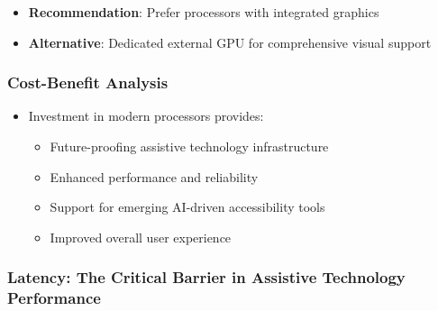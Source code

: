 \begin{itemize}
\item \textbf{Recommendation}: Prefer processors with integrated graphics \cite{IntelIntegratedGraphics}
\item \textbf{Alternative}: Dedicated external GPU for comprehensive visual support \cite{ExternalGPUAssistiveTech}
\end{itemize}


\subsubsection{Cost-Benefit Analysis}

\begin{itemize}
\item Investment in modern processors provides:
\begin{itemize}
\item Future-proofing assistive technology infrastructure \cite{FutureProofingTech}
\item Enhanced performance and reliability \cite{ModernProcessorBenefits}
\item Support for emerging AI-driven accessibility tools \cite{AIinAccessibility}
\item Improved overall user experience \cite{UserExperienceImprovements}
\end{itemize}
\end{itemize}


\subsubsection{Latency: The Critical Barrier in Assistive Technology Performance}

